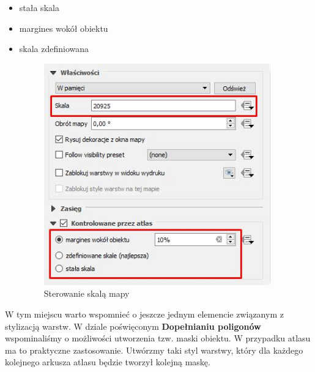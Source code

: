 \documentclass[12pt,a4paper]{book}
\begin{document}
\begin{itemize}
\item stała skala
\item margines wokół obiektu
\item skala zdefiniowana
\begin{center}
\begin{figure}
\includegraphics[width=9.797cm,height=9.581cm]{008-atlas-skala.png}
\caption{Sterowanie skalą mapy}
\end{figure}
\end{center}
\end{itemize}
W tym miejscu warto wspomnieć o jeszcze jednym elemencie związanym z stylizacją warstw. W dziale poświęconym \textbf{Dopełnianiu poligonów} wspominaliśmy o możliwości utworzenia tzw. maski obiektu. W przypadku atlasu ma to praktyczne zastosowanie. Utwórzmy taki styl warstwy, który dla każdego kolejnego arkusza atlasu będzie tworzył kolejną maskę.
\end{document}
